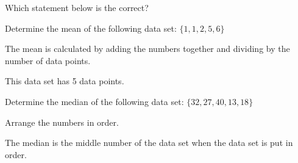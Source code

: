 \documentclass{ximera}
\begin{document}
\begin{question}
Which statement below is the correct?

    \begin{multipleChoice}
    \end{multipleChoice}

\end{question} 

\begin{question}
Determine the mean of the following data set: $\{1, 1, 2, 5, 6\}$

    \begin{multipleChoice}
    \end{multipleChoice}
    \begin{hint}
      The mean is calculated by adding the numbers together and dividing by the number of data points.
    \end{hint}
    \begin{hint}
      This data set has 5 data points.
    \end{hint}

\end{question}

\begin{question}
Determine the median of the following data set: $\{32, 27, 40, 13, 18\}$

    \begin{hint}
      Arrange the numbers in order.
    \end{hint}
    \begin{hint}
      The median is the middle number of the data set when the data set is put in order.
    \end{hint}
    \begin{multipleChoice}
    \end{multipleChoice}

\end{question}
\end{document}
